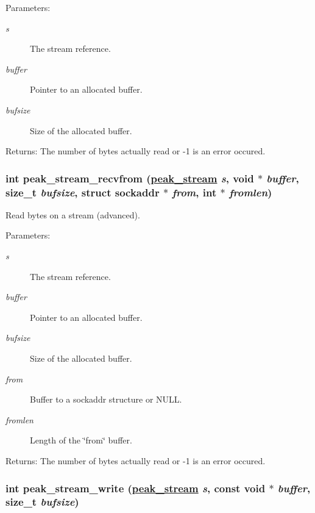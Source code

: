\begin{Desc}
\item[Parameters:]
\begin{description}
\item[{\em s}]The stream reference. \item[{\em buffer}]Pointer to an allocated buffer. \item[{\em bufsize}]Size of the allocated buffer.\end{description}
\end{Desc}
\begin{Desc}
\item[Returns:]The number of bytes actually read or -1 is an error occured. \end{Desc}
\hypertarget{group__stream__low_ga1}{
\subsubsection[peak\_\-stream\_\-recvfrom]{\setlength{\rightskip}{0pt plus 5cm}int peak\_\-stream\_\-recvfrom (\hyperlink{group__stream_ga0}{peak\_\-stream} {\em s}, void $\ast$ {\em buffer}, size\_\-t {\em bufsize}, struct sockaddr $\ast$ {\em from}, int $\ast$ {\em fromlen})}}
\label{group__stream__low_ga1}


Read bytes on a stream (advanced). 

\begin{Desc}
\item[Parameters:]
\begin{description}
\item[{\em s}]The stream reference. \item[{\em buffer}]Pointer to an allocated buffer. \item[{\em bufsize}]Size of the allocated buffer. \item[{\em from}]Buffer to a sockaddr structure or NULL. \item[{\em fromlen}]Length of the \char`\"{}from\char`\"{} buffer.\end{description}
\end{Desc}
\begin{Desc}
\item[Returns:]The number of bytes actually read or -1 is an error occured. \end{Desc}
\hypertarget{group__stream__low_ga2}{
\subsubsection[peak\_\-stream\_\-write]{\setlength{\rightskip}{0pt plus 5cm}int peak\_\-stream\_\-write (\hyperlink{group__stream_ga0}{peak\_\-stream} {\em s}, const void $\ast$ {\em buffer}, size\_\-t {\em bufsize})}}
\label{group__stream__low_ga2}


